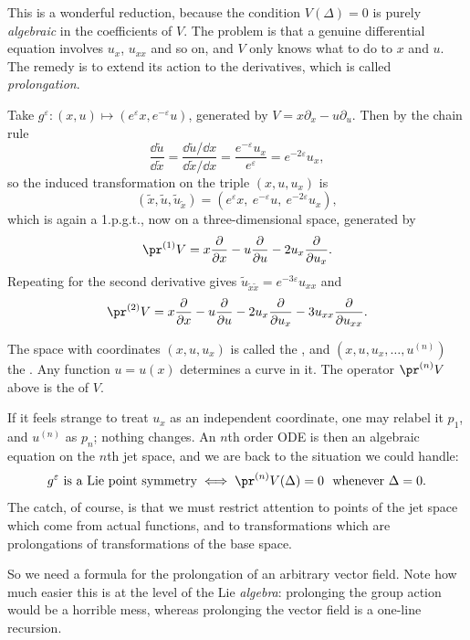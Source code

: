 This is a wonderful reduction, because the condition $V(\Delta) = 0$ is purely \emph{algebraic} in the coefficients of $V$. The problem is that a genuine differential equation involves $u_x$, $u_{xx}$ and so on, and $V$ only knows what to do to $x$ and $u$. The remedy is to extend its action to the derivatives, which is called \emph{prolongation}.

\begin{example}
	Take $g^\varepsilon : (x,u)\mapsto(e^\varepsilon x, e^{-\varepsilon}u)$, generated by $V = x\partial_x - u\partial_u$. Then by the chain rule
	$$
	\frac{\dd\tilde u}{\dd\tilde x} = \frac{\dd\tilde u/\dd x}{\dd\tilde x/\dd x} = \frac{e^{-\varepsilon}u_x}{e^\varepsilon} = e^{-2\varepsilon}u_x,
	$$
	so the induced transformation on the triple $(x,u,u_x)$ is
	$$
	\left(\tilde x,\tilde u,\tilde u_{\tilde x}\right) = \left(e^\varepsilon x,\ e^{-\varepsilon}u,\ e^{-2\varepsilon}u_x\right),
	$$
	which is again a 1.p.g.t., now on a three-dimensional space, generated by
	$$
	\pr^{(1)}V = x\frac{\partial}{\partial x} - u\frac{\partial}{\partial u} - 2u_x\frac{\partial}{\partial u_x}.
	$$
	Repeating for the second derivative gives $\tilde u_{\tilde x\tilde x} = e^{-3\varepsilon}u_{xx}$ and
	$$
	\pr^{(2)}V = x\frac{\partial}{\partial x} - u\frac{\partial}{\partial u} - 2u_x\frac{\partial}{\partial u_x} - 3u_{xx}\frac{\partial}{\partial u_{xx}}.
	$$
\end{example}

The space with coordinates $(x,u,u_x)$ is called the , and $(x,u,u_x,\dots,u^{(n)})$ the . Any function $u = u(x)$ determines a curve in it. The operator $\pr^{(n)}V$ above is the  of $V$.

If it feels strange to treat $u_x$ as an independent coordinate, one may relabel it $p_1$, and $u^{(n)}$ as $p_n$; nothing changes. An $n$th order ODE is then an algebraic equation on the $n$th jet space, and we are back to the situation we could handle:
$$
g^\varepsilon\text{ is a Lie point symmetry} \iff \pr^{(n)}V(\Delta) = 0\ \text{ whenever }\Delta = 0.
$$
The catch, of course, is that we must restrict attention to points of the jet space which come from actual functions, and to transformations which are prolongations of transformations of the base space.

So we need a formula for the prolongation of an arbitrary vector field. Note how much easier this is at the level of the Lie \emph{algebra}: prolonging the group action would be a horrible mess, whereas prolonging the vector field is a one-line recursion.

